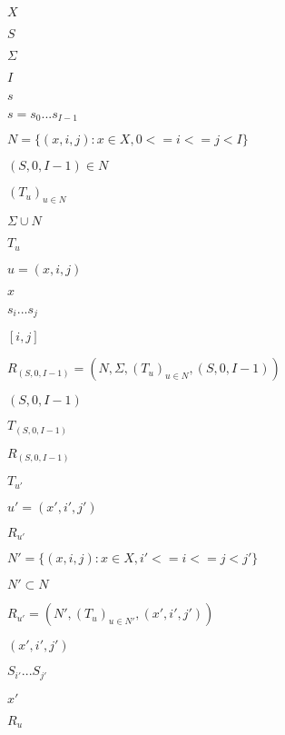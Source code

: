 \documentclass{article}
\begin{document}
$X$
\pagebreak

$S$
\pagebreak

$\Sigma$
\pagebreak

$I$
\pagebreak

$s$
\pagebreak

$s = s_0...s_{I - 1}$
\pagebreak

$N = \{ (x,i,j) : x \in X , 0 <= i <= j < I \}$
\pagebreak

$(S,0,I-1) \in N$
\pagebreak

$(T_u)_{u \in N}$
\pagebreak

$\Sigma \cup N$
\pagebreak

$T_u$
\pagebreak

$u = (x, i, j)$
\pagebreak

$x$
\pagebreak

$s_i ... s_j$
\pagebreak

$[i,j]$
\pagebreak

$R_{(S,0,I-1)} = (N, \Sigma, (T_u)_{u \in N}, (S,0,I-1))$
\pagebreak

$(S,0,I-1)$
\pagebreak

$T_{(S,0,I-1)}$
\pagebreak

$R_{(S,0,I-1)}$
\pagebreak

$T_{u'}$
\pagebreak

$u' = (x', i', j')$
\pagebreak

$R_{u'}$
\pagebreak

$N' = \{ (x,i,j) : x \in X , i' <= i <=j < j' \}$
\pagebreak

$N' \subset N$
\pagebreak

$R_{u'} = (N', (T_u)_{u \in N'}, (x', i', j') )$
\pagebreak

$(x', i', j')$
\pagebreak

$S_{i'} ... S_{j'}$
\pagebreak

$x'$
\pagebreak

$R_u$
\pagebreak
\end{document}
